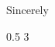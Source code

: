 \documentclass[letterpaper, 10pt]{article}
\begin{document}

\blindtext

\blindtext

\closing{Sincerely}{0.5 \baselineskip}{3 \baselineskip}
\end{document}
